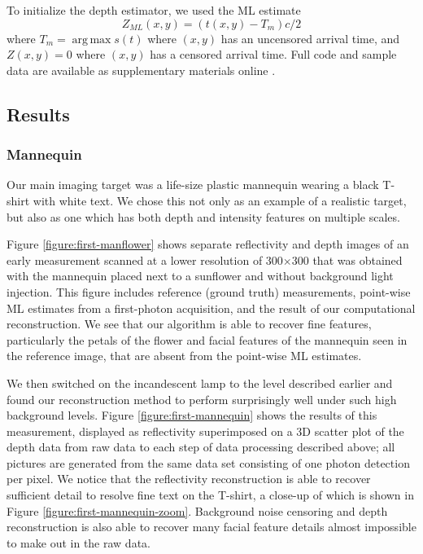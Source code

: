 To initialize the depth estimator, we used the ML estimate
\begin{equation}
Z_{ML}(x,y) = (t(x,y) - T_m)c/2
\end{equation}
where $T_m = \operatorname{arg\,max} s(t)$ where $(x,y)$ has an uncensored arrival time, and $Z(x,y) = 0$ where $(x,y)$ has a censored arrival time. Full code and sample data are available as supplementary materials online \cite{kirmani-first}.

\subsection{Results}

\subsubsection{Mannequin}
Our main imaging target was a life-size plastic mannequin wearing a black T-shirt with white text. We chose this not only as an example of a realistic target, but also as one which has both depth and intensity features on multiple scales.

Figure \ref{figure:first-manflower} shows separate reflectivity and depth images of an early measurement scanned at a lower resolution of 300$\times$300 that was obtained with the mannequin placed next to a sunflower and without background light injection. This figure includes reference (ground truth) measurements, point-wise ML estimates from a first-photon acquisition, and the result of our computational reconstruction. We see that our algorithm is able to recover fine features, particularly the petals of the flower and facial features of the mannequin seen in the reference image, that are absent from the point-wise ML estimates.

We then switched on the incandescent lamp to the level described earlier and found our reconstruction method to perform surprisingly well under such high background levels. Figure \ref{figure:first-mannequin} shows the results of this measurement, displayed as reflectivity superimposed on a 3D scatter plot of the depth data from raw data to each step of data processing described above; all pictures are generated from the same data set consisting of one photon detection per pixel. We notice that the reflectivity reconstruction is able to recover sufficient detail to resolve fine text on the T-shirt, a close-up of which is shown in Figure \ref{figure:first-mannequin-zoom}. Background noise censoring and depth reconstruction is also able to recover many facial feature details almost impossible to make out in the raw data.

